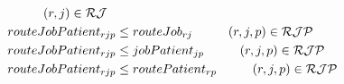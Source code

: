 \begin{align}
				&	\hspace{10mm} (r, j) \in \mathcal{RJ} \\
		& routeJobPatient_{rjp} \le routeJob_{rj}	
				\hspace{10mm} (r, j, p) \in \mathcal{RJP} \\
		& routeJobPatient_{rjp} \le jobPatient_{jp}
				\hspace{10mm} (r, j, p) \in \mathcal{RJP} \\
		& routeJobPatient_{rjp} \le routePatient_{rp}
				\hspace{10mm} (r, j, p) \in \mathcal{RJP} \\
\end{align}